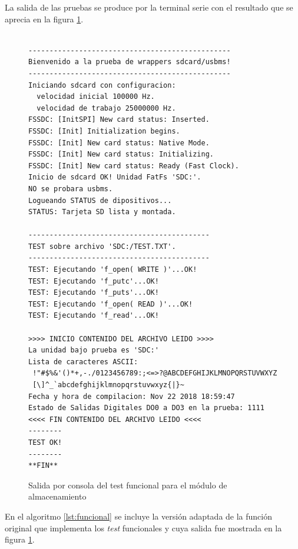 La salida de las pruebas se produce por la terminal serie con el resultado que se aprecia en la figura \ref{fig:test_funcional}.

\begin{figure}[htpb]
\begin{center}
\begin{verbatim}

------------------------------------------------
Bienvenido a la prueba de wrappers sdcard/usbms!
------------------------------------------------
Iniciando sdcard con configuracion:
  velocidad inicial 100000 Hz.
  velocidad de trabajo 25000000 Hz.
FSSDC: [InitSPI] New card status: Inserted.
FSSDC: [Init] Initialization begins.
FSSDC: [Init] New card status: Native Mode.
FSSDC: [Init] New card status: Initializing.
FSSDC: [Init] New card status: Ready (Fast Clock).
Inicio de sdcard OK! Unidad FatFs 'SDC:'.
NO se probara usbms.
Logueando STATUS de dipositivos...
STATUS: Tarjeta SD lista y montada.

-------------------------------------------
TEST sobre archivo 'SDC:/TEST.TXT'.
-------------------------------------------
TEST: Ejecutando 'f_open( WRITE )'...OK!
TEST: Ejecutando 'f_putc'...OK!
TEST: Ejecutando 'f_puts'...OK!
TEST: Ejecutando 'f_open( READ )'...OK!
TEST: Ejecutando 'f_read'...OK!

>>>> INICIO CONTENIDO DEL ARCHIVO LEIDO >>>>
La unidad bajo prueba es 'SDC:'
Lista de caracteres ASCII:
 !"#$%&'()*+,-./0123456789:;<=>?@ABCDEFGHIJKLMNOPQRSTUVWXYZ
 [\]^_`abcdefghijklmnopqrstuvwxyz{|}~
Fecha y hora de compilacion: Nov 22 2018 18:59:47
Estado de Salidas Digitales DO0 a DO3 en la prueba: 1111
<<<< FIN CONTENIDO DEL ARCHIVO LEIDO <<<<
--------
TEST OK!
--------
**FIN**
\end{verbatim}
\end{center}
\caption{Salida por consola del test funcional para el módulo de almacenamiento}
\label{fig:test_funcional}
\end{figure}


%


En el algoritmo \ref{lst:funcional} se incluye la versión adaptada de la función original que implementa los \textit{test} funcionales y cuya salida fue mostrada en la figura \ref{fig:test_funcional}. %

